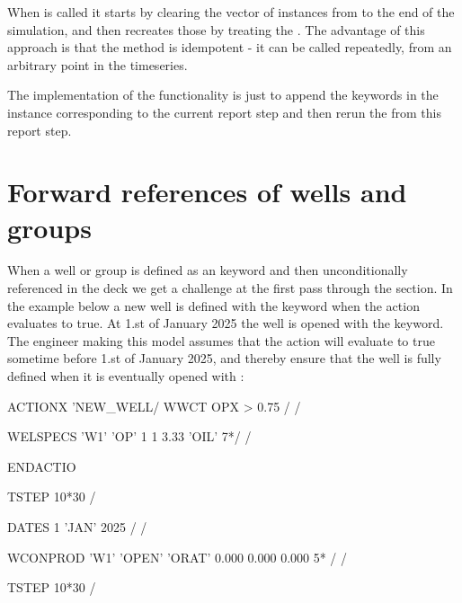 When  is called it
starts by clearing the vector of  instances from
 to the end of the simulation, and then recreates those
by treating the . The advantage of this approach is
that the  method is
idempotent - it can be called repeatedly, from an arbitrary point in the
timeseries.

The implementation of the \actionx{} functionality is just to append the
\actionx{} keywords in the  instance corresponding to
the current report step and then rerun the
 from this report step.



\section{Forward references of wells and groups}
When a well or group is defined as an \actionx{} keyword and then
unconditionally referenced in the deck we get a challenge at the first pass
through the  section. In the example below a new well  is
defined with the  keyword when the action 
evaluates to true. At 1.st of January 2025 the well  is opened with the
 keyword. The engineer making this model assumes that the
 action will evaluate to true sometime before 1.st of
January 2025, and thereby ensure that the well is fully defined when it is
eventually opened with :
\begin{deck}
ACTIONX
   'NEW_WELL/
   WWCT OPX  > 0.75 /
/

WELSPECS
  'W1'  'OP'  1 1 3.33  'OIL' 7*/
/

ENDACTIO

TSTEP
  10*30 /

DATES
   1 'JAN' 2025 /
/

WCONPROD
 'W1'      'OPEN'      'ORAT'      0.000      0.000      0.000  5* /
/

TSTEP
  10*30 /

\end{deck}

